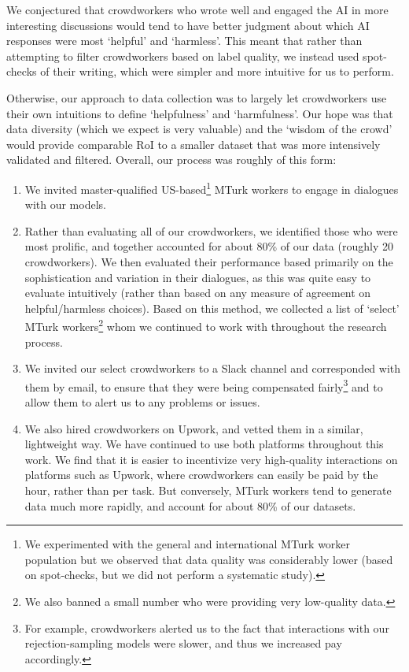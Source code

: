 We conjectured that crowdworkers who wrote well and engaged the AI in more interesting discussions would tend to have better judgment about which AI responses were most `helpful' and `harmless'.  This meant that rather than attempting to filter crowdworkers based on label quality, we instead used spot-checks of their writing, which were simpler and more intuitive for us to perform.

Otherwise, our approach to data collection was to largely let crowdworkers use their own intuitions to define `helpfulness' and `harmfulness'.  Our hope was that data diversity (which we expect is very valuable) and the `wisdom of the crowd' would provide comparable RoI to a smaller dataset that was more intensively validated and filtered. Overall, our process was roughly of this form:

\begin{enumerate}
    \item We invited  master-qualified US-based\footnote{We experimented with the general and international MTurk worker population but we observed that data quality was considerably lower (based on spot-checks, but we did not perform a systematic study).} MTurk workers to engage in dialogues with our models.  
    \item Rather than evaluating all of our crowdworkers, we identified  those who were most prolific, and together accounted for about 80\% of our data (roughly 20 crowdworkers).  We then evaluated their performance based primarily on the sophistication and variation in their dialogues, as this was quite easy to evaluate intuitively (rather than based on any measure of agreement on helpful/harmless choices).  Based on this method, we collected a list of `select' MTurk workers\footnote{We also banned a small number who were providing very low-quality data.} whom we continued to work with throughout the research process.  
    \item We invited our select crowdworkers to a Slack channel and corresponded with them by email, to ensure that they were being compensated fairly\footnote{For example, crowdworkers alerted us to the fact that interactions with our rejection-sampling models were slower, and thus we increased pay accordingly.} and to allow them to alert us to any problems or issues.
    \item We also hired crowdworkers on Upwork, and vetted them in a similar, lightweight way.  We have continued to use both platforms throughout this work.  We find that it is easier to incentivize very high-quality interactions on platforms such as Upwork, where crowdworkers can easily be paid by the hour, rather than per task.  But conversely, MTurk workers tend to generate  data much more rapidly, and account for about 80\% of our datasets.
\end{enumerate}


